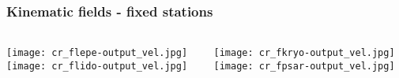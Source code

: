 \begin{frame}
  \frametitle{Kinematic fields -  fixed stations}
  \framesubtitle{}
  \label{}
  \vskip-1.2cm
  \begin{columns}[T]
    \begin{column}{.5\textwidth}
      \begin{center}
        \texttt{[image: cr\_flepe-output\_vel.jpg]}\\[.1em]
        \texttt{[image: cr\_flido-output\_vel.jpg]}
      \end{center} 
    \end{column}
    \begin{column}{.5\textwidth}
      \begin{center}
        \texttt{[image: cr\_fkryo-output\_vel.jpg]}\\[.1em]
        \texttt{[image: cr\_fpsar-output\_vel.jpg]}
      \end{center} 
    \end{column}
  \end{columns}
\end{frame}
\note{}

%

% 	  
%
%
%        

